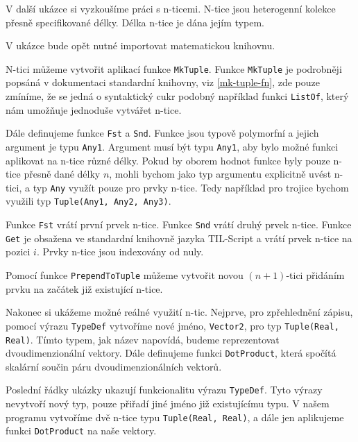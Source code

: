 V další ukázce si vyzkoušíme práci s n-ticemi. N-tice jsou heterogenní kolekce přesně specifikované
délky. Délka n-tice je dána jejím typem.

V ukázce bude opět nutné importovat matematickou knihovnu.

N-tici můžeme vytvořit aplikací funkce \lstinline{MkTuple}. Funkce \lstinline{MkTuple} je podrobněji
popsáná v dokumentaci standardní knihovny, viz \ref{mk-tuple-fn}, zde pouze zmíníme, že se
jedná o syntaktický cukr podobný například funkci \lstinline{ListOf}, který nám umožňuje jednoduše
vytvářet n-tice.

Dále definujeme funkce \lstinline{Fst} a \lstinline{Snd}. Funkce jsou typově polymorfní a jejich
argument je typu \lstinline{Any1}. Argument musí být typu \lstinline{Any1}, aby bylo možné funkci
aplikovat na n-tice různé délky. Pokud by oborem hodnot funkce byly pouze n-tice přesně dané délky
$n$, mohli bychom jako typ argumentu explicitně uvést n-tici, a typ \lstinline{Any} využít pouze
pro prvky n-tice. Tedy například pro trojice bychom využili typ \lstinline{Tuple(Any1, Any2, Any3)}.

Funkce \lstinline{Fst} vrátí první prvek n-tice. Funkce \lstinline{Snd} vrátí druhý prvek n-tice.
Funkce \lstinline{Get} je obsažena ve standardní knihovně jazyka TIL-Script a vrátí prvek n-tice
na pozici $i$. Prvky n-tice jsou indexovány od nuly.

Pomocí funkce \lstinline{PrependToTuple} můžeme vytvořit novou $(n+1)$-tici přidáním prvku
na začátek již existující n-tice.

Nakonec si ukážeme možné reálné využití n-tic. Nejprve, pro zpřehlednění zápisu, pomocí výrazu
\lstinline{TypeDef} vytvoříme nové jméno, \lstinline{Vector2}, pro typ
\lstinline{Tuple(Real, Real)}. Tímto typem, jak název napovídá, budeme reprezentovat
dvoudimenzionální vektory. Dále definujeme funkci \lstinline{DotProduct}, která spočítá skalární
součin páru dvoudimenzionálních vektorů.

Poslední řádky ukázky ukazují funkcionalitu výrazu \lstinline{TypeDef}. Tyto výrazy nevytvoří nový
typ, pouze přiřadí jiné jméno již existujícímu typu. V našem programu vytvoříme dvě n-tice typu
\lstinline{Tuple(Real, Real)}, a dále jen aplikujeme funkci \lstinline{DotProduct} na naše vektory.

